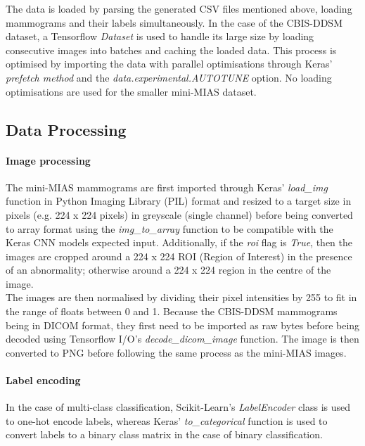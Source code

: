 The data is loaded by parsing the generated CSV files mentioned above, loading mammograms and their labels simultaneously. In the case of the CBIS-DDSM dataset, a Tensorflow \textit{Dataset} is used to handle its large size by loading consecutive images into batches and caching the loaded data. This process is optimised by importing the data with parallel optimisations through Keras' \textit{prefetch method} and the \textit{data.experimental.AUTOTUNE} option. No loading optimisations are used for the smaller mini-MIAS dataset.\\


\subsection{Data Processing}

\paragraph{Image processing} 

The mini-MIAS mammograms are first imported through Keras' \textit{load\_img} function in Python Imaging Library (PIL) format and resized to a target size in pixels (e.g. 224 x 224 pixels) in greyscale (single channel) before being converted to array format using the \textit{img\_to\_array} function to be compatible with the Keras CNN models expected input. Additionally, if the \textit{roi} flag is \textit{True}, then the images are cropped around a 224 x 224 ROI (Region of Interest) in the presence of an abnormality; otherwise around a 224 x 224 region in the centre of the image.\\

The images are then normalised by dividing their pixel intensities by 255 to fit in the range of floats between 0 and 1. Because the CBIS-DDSM mammograms being in DICOM format, they first need to be imported as raw bytes before being decoded using Tensorflow I/O's \textit{decode\_dicom\_image} function. The image is then converted to PNG before following the same process as the mini-MIAS images.

\paragraph{Label encoding}

In the case of multi-class classification, Scikit-Learn's \textit{LabelEncoder} class is used to one-hot encode labels, whereas Keras' \textit{to\_categorical} function is used to convert labels to a binary class matrix in the case of binary classification.

